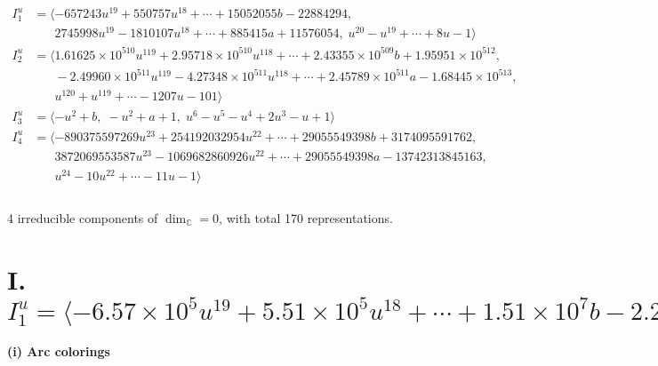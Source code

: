 \documentclass[1p]{elsarticle_modified}
\theoremstyle{definition}
\begin{document}
\begin{align*}
I^u_{1}&=\langle 
-657243 u^{19}+550757 u^{18}+\cdots+15052055 b-22884294,\\
\phantom{I^u_{1}}&\phantom{= \langle  }2745998 u^{19}-1810107 u^{18}+\cdots+885415 a+11576054,\;u^{20}- u^{19}+\cdots+8 u-1\rangle \\
I^u_{2}&=\langle 
1.61625\times10^{510} u^{119}+2.95718\times10^{510} u^{118}+\cdots+2.43355\times10^{509} b+1.95951\times10^{512},\\
\phantom{I^u_{2}}&\phantom{= \langle  }-2.49960\times10^{511} u^{119}-4.27348\times10^{511} u^{118}+\cdots+2.45789\times10^{511} a-1.68445\times10^{513},\\
\phantom{I^u_{2}}&\phantom{= \langle  }u^{120}+u^{119}+\cdots-1207 u-101\rangle \\
I^u_{3}&=\langle 
- u^2+b,\;- u^2+a+1,\;u^6- u^5- u^4+2 u^3- u+1\rangle \\
I^u_{4}&=\langle 
-890375597269 u^{23}+254192032954 u^{22}+\cdots+29055549398 b+3174095591762,\\
\phantom{I^u_{4}}&\phantom{= \langle  }3872069553587 u^{23}-1069682860926 u^{22}+\cdots+29055549398 a-13742313845163,\\
\phantom{I^u_{4}}&\phantom{= \langle  }u^{24}-10 u^{22}+\cdots-11 u-1\rangle \\
\\
\end{align*}
\raggedright * 4 irreducible components of $\dim_{\mathbb{C}}=0$, with total 170 representations.\\
\newpage
\renewcommand{\arraystretch}{1}
\centering \section*{I. $I^u_{1}= \langle -6.57\times10^{5} u^{19}+5.51\times10^{5} u^{18}+\cdots+1.51\times10^{7} b-2.29\times10^{7},\;2.75\times10^{6} u^{19}-1.81\times10^{6} u^{18}+\cdots+8.85\times10^{5} a+1.16\times10^{7},\;u^{20}- u^{19}+\cdots+8 u-1 \rangle$}
\flushleft \textbf{(i) Arc colorings}\\
\end{document}
